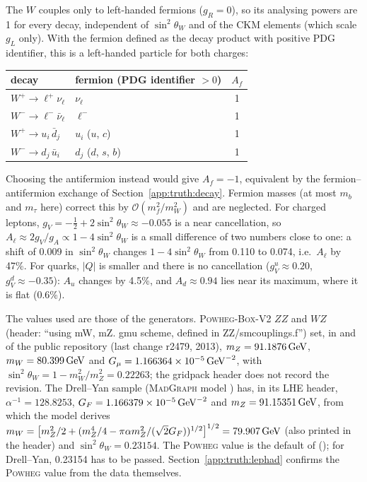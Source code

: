 The $W$ couples only to left-handed fermions ($g_R = 0$), so its analysing powers are 1 for every decay, independent
of $\sin^2\theta_W$ and of the CKM elements (which scale $g_L$ only). With the fermion defined as the decay product
with positive PDG identifier, this is a left-handed particle for both charges:
\begin{center}
\small
\begin{tabular}{llc}
\toprule
decay & fermion (PDG identifier $> 0$) & $A_f$ \\
\midrule
$W^+ \to \ell^+\nu_\ell$ & $\nu_\ell$ & 1 \\
$W^- \to \ell^-\bar\nu_\ell$ & $\ell^-$ & 1 \\
$W^+ \to u_i\,\bar d_j$ & $u_i$ ($u$, $c$) & 1 \\
$W^- \to d_j\,\bar u_i$ & $d_j$ ($d$, $s$, $b$) & 1 \\
\bottomrule
\end{tabular}
\end{center}
Choosing the antifermion instead would give $A_f = -1$, equivalent by the fermion--antifermion exchange of
Section~\ref{app:truth:decay}. Fermion masses (at most $m_b$ and $m_\tau$ here) correct this by $\mathcal{O}(m_f^2/m_W^2)$
and are neglected.
For charged leptons, $g_V = -\tfrac12 + 2\sin^2\theta_W \approx -0.055$ is a near cancellation, so
$A_\ell \approx 2g_V/g_A \propto 1 - 4\sin^2\theta_W$ is a small difference of two numbers close to one: a shift of
0.009 in $\sin^2\theta_W$ changes $1 - 4\sin^2\theta_W$ from 0.110 to 0.074, i.e.\ $A_\ell$ by 47\%. For quarks,
$|Q|$ is smaller and there is no cancellation ($g_V^u \approx 0.20$, $g_V^d \approx -0.35$): $A_u$ changes by 4.5\%,
and $A_d \approx 0.94$ lies near its maximum, where it is flat (0.6\%).

The values used are those of the generators. \textsc{Powheg-Box-V2} $ZZ$ and $WZ$ (header: ``using mW, mZ. gmu
scheme, defined in ZZ/smcouplings.f'') set, in  and  of the public
repository (last change r2479, 2013), $m_Z = 91.1876\,\mathrm{GeV}$, $m_W = 80.399\,\mathrm{GeV}$ and $G_\mu = 1.166364\times10^{-5}\,\mathrm{GeV}^{-2}$,
with $\sin^2\theta_W = 1 - m_W^2/m_Z^2 = 0.22263$; the gridpack header does not record the revision. The Drell--Yan
sample (\textsc{MadGraph} model ) has, in its LHE header, $\alpha^{-1} = 128.8253$,
$G_F = 1.166379\times10^{-5}\,\mathrm{GeV}^{-2}$ and $m_Z = 91.15351\,\mathrm{GeV}$, from which the model derives
$m_W = \big[m_Z^2/2 + (m_Z^4/4 - \pi\alpha m_Z^2/(\sqrt2 G_F))^{1/2}\big]^{1/2} = 79.907\,\mathrm{GeV}$ (also printed in the
header) and $\sin^2\theta_W = 0.23154$. The \textsc{Powheg} value is the default of 
(); for Drell--Yan, 0.23154 has to be passed. Section~\ref{app:truth:lephad} confirms the \textsc{Powheg} value
from the data themselves.

